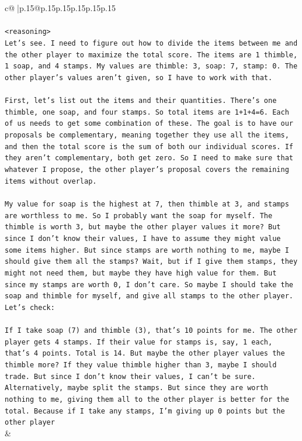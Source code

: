 \documentclass{article}
\begin{document}
{\begin{supertabular}{c@{$\;$}|p{.15\linewidth}@{}p{.15\linewidth}p{.15\linewidth}p{.15\linewidth}p{.15\linewidth}p{.15\linewidth}}
{{{\\ 
\\ 
\texttt{<reasoning>} \\
\texttt{Let's see. I need to figure out how to divide the items between me and the other player to maximize the total score. The items are 1 thimble, 1 soap, and 4 stamps. My values are thimble: 3, soap: 7, stamp: 0. The other player's values aren't given, so I have to work with that.} \\
\\ 
\texttt{First, let's list out the items and their quantities. There's one thimble, one soap, and four stamps. So total items are 1+1+4=6. Each of us needs to get some combination of these. The goal is to have our proposals be complementary, meaning together they use all the items, and then the total score is the sum of both our individual scores. If they aren't complementary, both get zero. So I need to make sure that whatever I propose, the other player's proposal covers the remaining items without overlap.} \\
\\ 
\texttt{My value for soap is the highest at 7, then thimble at 3, and stamps are worthless to me. So I probably want the soap for myself. The thimble is worth 3, but maybe the other player values it more? But since I don't know their values, I have to assume they might value some items higher. But since stamps are worth nothing to me, maybe I should give them all the stamps? Wait, but if I give them stamps, they might not need them, but maybe they have high value for them. But since my stamps are worth 0, I don't care. So maybe I should take the soap and thimble for myself, and give all stamps to the other player. Let's check:} \\
\\ 
\texttt{If I take soap (7) and thimble (3), that's 10 points for me. The other player gets 4 stamps. If their value for stamps is, say, 1 each, that's 4 points. Total is 14. But maybe the other player values the thimble more? If they value thimble higher than 3, maybe I should trade. But since I don't know their values, I can't be sure. Alternatively, maybe split the stamps. But since they are worth nothing to me, giving them all to the other player is better for the total. Because if I take any stamps, I'm giving up 0 points but the other player} \\
            }
        }
    }
    & \\ \\


\end{supertabular}}
\end{document}

